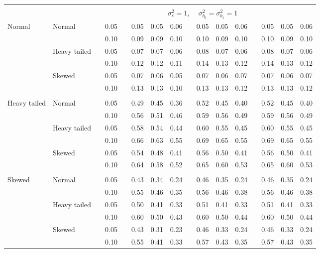 \documentclass[12pt]{article} %
\begin{document}
\begin{table}[ht]
\begin{scriptsize}
\begin{center}
\begin{tabular}{ll p{.1cm} c p{.1cm} rrr p{.1cm} rrr p{.1cm} rrr}
&&&&&&&&&&&&&&&\\
& && && \multicolumn{9}{c}{$\sigma_{\varepsilon}^2 = 1$, \ \ $\sigma_{b_0}^2 = \sigma_{b_1}^2 = 1$} \\ \cline{6-16}
\rowcolor{gray!20}Normal       & Normal       && 0.05 &&   0.05 & 0.05 & 0.06 && 0.05 & 0.05 & 0.06 && 0.05 & 0.05 & 0.06 \\ 
\rowcolor{gray!20}             &              && 0.10 &&   0.09 & 0.09 & 0.10 && 0.10 & 0.09 & 0.10 && 0.10 & 0.09 & 0.10 \\ 
\rowcolor{gray!20}             & Heavy tailed && 0.05 &&   0.07 & 0.07 & 0.06 && 0.08 & 0.07 & 0.06 && 0.08 & 0.07 & 0.06 \\ 
\rowcolor{gray!20}             &              && 0.10 &&   0.12 & 0.12 & 0.11 && 0.14 & 0.13 & 0.12 && 0.14 & 0.13 & 0.12 \\ 
\rowcolor{gray!20}             & Skewed       && 0.05 &&   0.07 & 0.06 & 0.05 && 0.07 & 0.06 & 0.07 && 0.07 & 0.06 & 0.07 \\ 
\rowcolor{gray!20}             &              && 0.10 &&   0.13 & 0.13 & 0.10 && 0.13 & 0.13 & 0.12 && 0.13 & 0.13 & 0.12 \\ 
             &&&&&&&&&&&&&&&\\
Heavy tailed & Normal       && 0.05 &&   0.49 & 0.45 & 0.36 && 0.52 & 0.45 & 0.40 && 0.52 & 0.45 & 0.40 \\ 
             &              && 0.10 &&   0.56 & 0.51 & 0.46 && 0.59 & 0.56 & 0.49 && 0.59 & 0.56 & 0.49 \\ 
             & Heavy tailed && 0.05 &&   0.58 & 0.54 & 0.44 && 0.60 & 0.55 & 0.45 && 0.60 & 0.55 & 0.45 \\ 
             &              && 0.10 &&   0.66 & 0.63 & 0.55 && 0.69 & 0.65 & 0.55 && 0.69 & 0.65 & 0.55 \\ 
             & Skewed       && 0.05 &&   0.54 & 0.48 & 0.41 && 0.56 & 0.50 & 0.41 && 0.56 & 0.50 & 0.41 \\ 
             &              && 0.10 &&   0.64 & 0.58 & 0.52 && 0.65 & 0.60 & 0.53 && 0.65 & 0.60 & 0.53 \\ 
             &&&&&&&&&&&&&&&\\
Skewed       & Normal       && 0.05 &&   0.43 & 0.34 & 0.24 && 0.46 & 0.35 & 0.24 && 0.46 & 0.35 & 0.24 \\ 
             &              && 0.10 &&   0.55 & 0.46 & 0.35 && 0.56 & 0.46 & 0.38 && 0.56 & 0.46 & 0.38 \\ 
             & Heavy tailed && 0.05 &&   0.50 & 0.41 & 0.33 && 0.51 & 0.41 & 0.33 && 0.51 & 0.41 & 0.33 \\ 
             &              && 0.10 &&   0.60 & 0.50 & 0.43 && 0.60 & 0.50 & 0.44 && 0.60 & 0.50 & 0.44 \\ 
             & Skewed       && 0.05 &&   0.43 & 0.31 & 0.23 && 0.46 & 0.33 & 0.24 && 0.46 & 0.33 & 0.24 \\ 
             &              && 0.10 &&   0.55 & 0.41 & 0.33 && 0.57 & 0.43 & 0.35 && 0.57 & 0.43 & 0.35 \\ 



\end{tabular}
\end{center}
\end{scriptsize}
\end{table}
\end{document}

